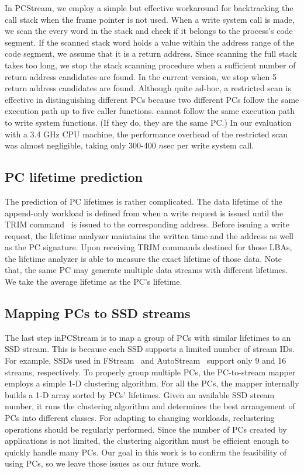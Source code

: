In \textsf{\small PCStream}, we employ a simple but effective workaround 
for backtracking the call stack when the frame pointer is not used.
When a write system call is made, we scan the every word in the stack and check
if it belongs to the process's code segment.  If the scanned stack word holds a
value within the address range of the code segment, we assume that it is a
return address.  Since scanning the full stack takes too long, we stop the
stack scanning procedure when a sufficient number of return address candidates
are found.  In the current version, we stop when 5 return address candidates
are found.  Although quite ad-hoc, a restricted scan is effective in
distinguishing different PCs because two different PCs
follow the same execution path up to five caller functions.   
cannot follow the same execution path to write system functions.  
(If they do, they are the same PC.) In our evaluation
with a 3.4 GHz CPU machine, the performance overhead of the restricted scan was
almost negligible, taking only 300-400 $n$sec per write system call.



\vspace{-10pt}
\subsection{PC lifetime prediction}
The prediction of PC lifetimes is rather complicated. 
The data lifetime of the append-only workload is defined 
from when a write request is issued until the TRIM command~\cite{TRIM} is issued to 
the corresponding address.
Before issuing a write request, the lifetime analyzer
maintains the written time and the address as well as the PC signature.
Upon receiving TRIM
commands destined for those LBAs, the lifetime analyzer is able to measure the
exact lifetime of those data. 
Note that, the
same PC may generate multiple data streams with different lifetimes.
We take the average lifetime as the PC's lifetime.

\vspace{-10pt}
\subsection{Mapping PCs to SSD streams}
\vspace{-5pt}
The last step inPCStream is to map
a group of PCs with similar lifetimes to an SSD stream.
This is because each SSD supports a limited number of stream IDs. For
example, SSDs used in FStream~\cite{FStream} and AutoStream~\cite{AutoStream}
support only 9 and 16 streams, respectively. To properly group multiple PCs,
the PC-to-stream mapper employs a simple 1-D clustering algorithm.  For all the
PCs, the mapper internally builds a 1-D array sorted by PCs' lifetimes.  Given
an available SSD stream number, it runs the clustering algorithm and determines
the best arrangement of PCs into different classes.  For adapting to changing
workloads, reclustering operations should be regularly performed. Since the
number of PCs created by applications is not limited, the clustering algorithm
must be efficient enough to quickly handle many PCs. Our goal in this work is
to confirm the feasibility of using PCs, so we leave
those issues as our future work.

